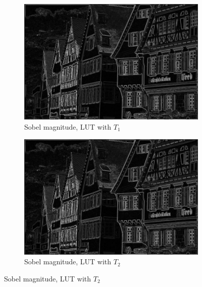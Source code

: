 \documentclass[12pt]{amsart}
\theoremstyle{definition}
\theoremstyle{remark}
\numberwithin{thm}{section}
\begin{document}
\begin{figure}[h]
\begin{subfigure}[b]{0.4\textwidth} \includegraphics[width=\textwidth]{german1.jpg} \caption{Sobel magnitude, LUT with $T_1$} %
\end{subfigure}
\begin{subfigure}[b]{0.4\textwidth} \includegraphics[width=\textwidth]{german2.jpg} \caption{Sobel magnitude, LUT with $T_2$} \end{subfigure}


\end{figure}
\end{document}
